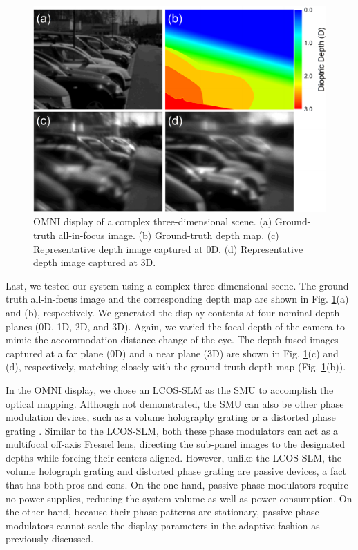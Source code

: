 \documentclass[9pt,twocolumn,twoside]{osajnl}
\begin{document}
\begin{figure}[htbp]
	\centering
	\includegraphics[width=\linewidth]{OMNIfig5}
	\caption{OMNI display of a complex three-dimensional scene. (a) Ground-truth all-in-focus image. (b) Ground-truth depth map. (c) Representative depth image captured at 0D. (d) Representative depth image captured at 3D.}
	\label{fig:5}
\end{figure}
Last, we tested our system using a complex three-dimensional scene. The ground-truth all-in-focus image and the corresponding depth map are shown in Fig. \ref{fig:5}(a) and (b), respectively. We generated the display contents at four nominal depth planes (0D, 1D, 2D, and 3D). Again, we varied the focal depth of the camera to mimic the accommodation distance change of the eye. The depth-fused images captured at a far plane (0D) and a near plane (3D) are shown in Fig. \ref{fig:5}(c) and (d), respectively, matching closely with the ground-truth depth map (Fig. \ref{fig:5}(b)).\par
In the OMNI display, we chose an LCOS-SLM as the SMU to accomplish the optical mapping. Although not demonstrated, the SMU can also be other phase modulation devices, such as a volume holography grating \cite{sinha2004imaging,luo2010simulations} or a distorted phase grating \cite{dalgarno2010multiplane,blanchard1999simultaneous}. Similar to the LCOS-SLM, both these phase modulators can act as a multifocal off-axis Fresnel lens, directing the sub-panel images to the designated depths while forcing their centers aligned. However, unlike the LCOS-SLM, the volume holograph grating and distorted phase grating are passive devices, a fact that has both pros and cons. On the one hand, passive phase modulators require no power supplies, reducing the system volume as well as power consumption. On the other hand, because their phase patterns are stationary, passive phase modulators cannot scale the display parameters in the adaptive fashion as previously discussed.\par
\end{document}
